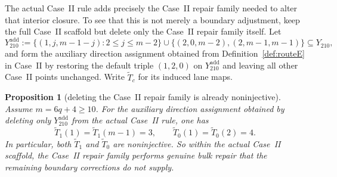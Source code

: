 \documentclass[11pt]{article}
\newtheorem{proposition}{Proposition}
\begin{document}
The actual Case~II rule adds precisely the Case~II repair family needed to alter that interior closure.
To see that this is not merely a boundary adjustment, keep the full Case~II scaffold but delete only the Case~II repair family itself.
Let
\[
Y_{210}^{\mathrm{add}}
:=
\{(1,j,m-1-j):2\le j\le m-2\}\cup\{(2,0,m-2),(2,m-1,m-1)\}
\subseteq Y_{210},
\]
and form the auxiliary direction assignment obtained from Definition~\ref{def:routeE} in Case~II by restoring the default triple $(1,2,0)$ on $Y_{210}^{\mathrm{add}}$ and leaving all other Case~II points unchanged.
Write $\widetilde T_c$ for its induced lane maps.

\begin{proposition}[deleting the Case~II repair family is already noninjective]\label{prop:boundary-no-go}
Assume $m=6q+4\ge 10$.
For the auxiliary direction assignment obtained by deleting only $Y_{210}^{\mathrm{add}}$ from the actual Case~II rule, one has
\[
\widetilde T_1(1)=\widetilde T_1(m-1)=3,
\qquad
\widetilde T_0(1)=\widetilde T_0(2)=4.
\]
In particular, both $\widetilde T_1$ and $\widetilde T_0$ are noninjective.
So within the actual Case~II scaffold, the Case~II repair family performs genuine bulk repair that the remaining boundary corrections do not supply.
\end{proposition}
\end{document}
